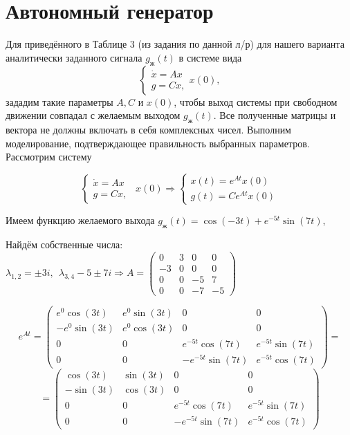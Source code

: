 \section{Автономный генератор}
Для приведённого в Таблице 3 (из задания по данной л/р) для нашего варианта аналитически заданного сигнала $g_\text{ж}(t)$ в системе вида
\[
\begin{cases}
\dot{x} = Ax \\
g = Cx,
\end{cases}x(0),
\]
зададим такие параметры $A, C$ и $x(0)$, чтобы выход системы при свободном движении совпадал с желаемым выходом $g_\text{ж}(t)$. Все полученные матрицы и вектора не должны включать в себя комплексных чисел. Выполним моделирование, подтверждающее правильность выбранных параметров.
\\

Рассмотрим систему


\begin{par}
$$\left\lbrace \begin{array}{c}
\dot{x} =Ax\\
g=Cx,
\end{array}\right.~~x(0)\Rightarrow \left\lbrace \begin{array}{c}
x(t)=e^{At} x(0)\\
g(t)=Ce^{At} x(0)
\end{array}\right.$$
\end{par}


Имеем функцию желаемого выхода $g_ж (t)=\cos (-3t)+e^{-5t} \sin (7t)$,



Найдём собственные числа: $\lambda_{1,2} =\pm 3i,~~\lambda_{3,4} -5\pm 7i\Rightarrow A=\left(\begin{array}{cccc}
0 & 3 & 0 & 0\\
-3 & 0 & 0 & 0\\
0 & 0 & -5 & 7\\
0 & 0 & -7 & -5
\end{array}\right)$


$$e^{At} =\left(\begin{array}{cccc}
e^0 \cos (3t) & e^0 \sin (3t) & 0 & 0\\
-e^0 \sin (3t) & e^0 \cos (3t) & 0 & 0\\
0 & 0 & e^{-5t} \cos (7t) & e^{-5t} \sin (7t)\\
0 & 0 & -e^{-5t} \sin (7t) & e^{-5t} \cos (7t)
\end{array}\right)=$$
$$
=\left(\begin{array}{cccc}
\cos (3t) & \sin (3t) & 0 & 0\\
-\sin (3t) & \cos (3t) & 0 & 0\\
0 & 0 & e^{-5t} \cos (7t) & e^{-5t} \sin (7t)\\
0 & 0 & -e^{-5t} \sin (7t) & e^{-5t} \cos (7t)
\end{array}\right)
$$


